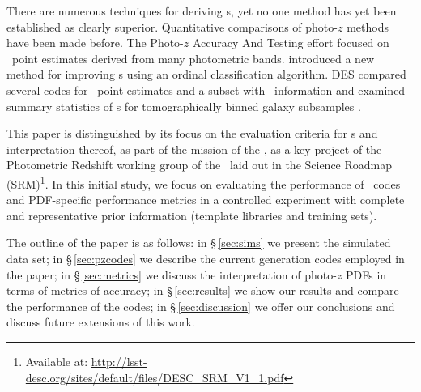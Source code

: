 There are numerous techniques for deriving \pzpdf s, yet no one method has yet been established as clearly superior.
Quantitative comparisons of photo-$z$ methods have been made before.
The Photo-$z$ Accuracy And Testing \citep[\textsc{PHAT},][]{Hildebrandt:10} effort focused on \pz\ point estimates derived from many photometric bands.
\citet{Rau:2015} introduced a new method for improving \pzpdf s using an ordinal classification algorithm.
\textsc{DES} compared several codes for \pz\ point estimates and a subset with \pzpdf\ information \citep{Sanchez:14} and examined summary statistics of \pzpdf s for tomographically binned galaxy subsamples \citep{Bonnett:16}.

This paper is distinguished by its focus on the evaluation criteria for \pzpdf s and interpretation thereof, as part of the mission of the , as a key project of the Photometric Redshift working group of the \lsstdesc\ laid out in the Science Roadmap (SRM)\footnote{Available at: \url{http://lsst-desc.org/sites/default/files/DESC_SRM_V1_1.pdf}}.
In this initial study, we focus on evaluating the performance of \pzpdf\ codes and PDF-specific performance metrics in a controlled experiment with complete and representative prior information (template libraries and training sets).

The outline of the paper is as follows: in \S\,\ref{sec:sims} we present the simulated data set; in \S\,\ref{sec:pzcodes} we describe the current generation codes employed in the paper; in \S\,\ref{sec:metrics} we discuss the interpretation of photo-$z$ PDFs in terms of metrics of accuracy; in \S\,\ref{sec:results} we show our results and compare the performance of the codes; in \S\,\ref{sec:discussion} we offer our conclusions and discuss future extensions of this work.
